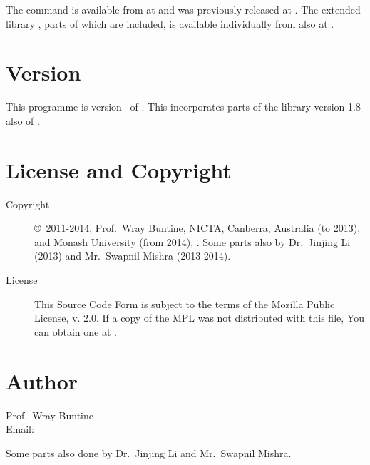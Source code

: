 \documentclass[a4paper,english]{article}
\begin{document}
The command  is available from   at
and was previously released at .
The extended library , parts of which are included, is available
individually from  also at
 .


\section{Version}

This programme is version \Version\ of \Date.
This incorporates parts of the library  version 1.8
also of \Date.

\section{License and Copyright}

\begin{description}
\item[Copyright] \copyright\ 2011-2014, Prof.~Wray Buntine, 
  NICTA, Canberra, Australia (to 2013), and Monash
University (from 2014),
     .
Some parts also by Dr.\ Jinjing Li (2013) and 
Mr.\ Swapnil Mishra (2013-2014).

\item[License]  This Source Code Form is subject to the terms of the Mozilla 
 Public License, v. 2.0. If a copy of the MPL was not
 distributed with this file, You can obtain one at
      .
\end{description}

\section{Author}

\noindent
Prof.~Wray Buntine                     \\
Email:   

Some parts also done by Dr.\ Jinjing Li and 
Mr.\ Swapnil Mishra.

\LatexManEnd
\end{document}
